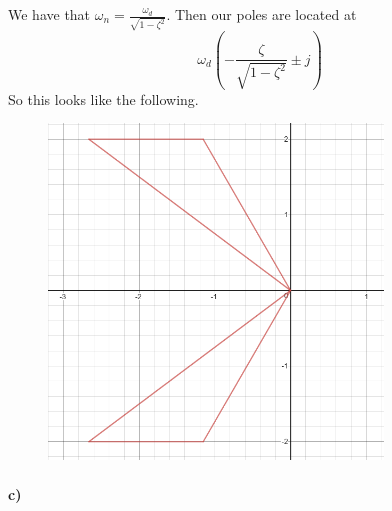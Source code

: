 \documentclass[12pt]{article}
\begin{document}
We have that \(\omega_n=\frac{\omega_d}{\sqrt{1-\zeta^2}}\). Then our poles are located at
\[\omega_d\left(-\frac{\zeta}{\sqrt{1-\zeta^2}}\pm j\right)\]
So this looks like the following.
\begin{figure}[H]
    \begin{center}
        \includegraphics[width=3.5in]{problem3b.png}
    \end{center}
\end{figure}

\paragraph{c)}
\end{document}
